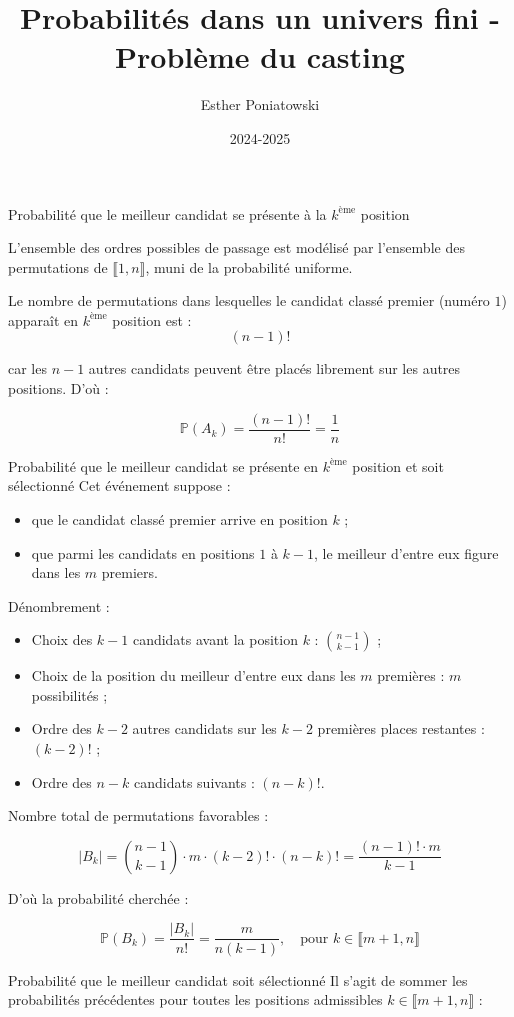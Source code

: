 \documentclass[10pt,a4paper]{article}
\title{Probabilités dans un univers fini - Problème du casting}
\author{Esther Poniatowski}
\date{2024-2025}
\begin{document}
\q Probabilité que le meilleur candidat se présente à la \( k^\text{ème} \) position

L'ensemble des ordres possibles de passage est modélisé par l'ensemble des permutations de \(
\llbracket 1, n \rrbracket \), muni de la probabilité uniforme.

Le nombre de permutations dans lesquelles le candidat classé premier (numéro \( 1 \)) apparaît en \(
k^\text{ème} \) position est :
\[
(n-1)!
\]

car les \( n-1 \) autres candidats peuvent être placés librement sur les autres positions. D'où :

\[
\mathbb{P}(A_k) = \frac{(n-1)!}{n!} = \boxed{\dfrac{1}{n}}
\]


\q Probabilité que le meilleur candidat se présente en \( k^\text{ème} \) position et soit
sélectionné
Cet événement suppose :
\begin{itemize}
 \item que le candidat classé premier arrive en position \( k \) ;
 \item que parmi les candidats en positions \( 1 \) à \( k-1 \), le meilleur d'entre eux figure dans
 les \( m \) premiers.
\end{itemize}

Dénombrement :
\begin{itemize}
 \item Choix des \( k-1 \) candidats avant la position \( k \) : \( \binom{n-1}{k-1} \) ;
 \item Choix de la position du meilleur d'entre eux dans les \( m \) premières : \( m \)
 possibilités ;
 \item Ordre des \( k-2 \) autres candidats sur les \( k-2 \) premières places restantes : \( (k-2)!
 \) ;
 \item Ordre des \( n - k \) candidats suivants : \( (n - k)! \).
\end{itemize}

Nombre total de permutations favorables :

\[
|B_k| = \binom{n-1}{k-1} \cdot m \cdot (k-2)! \cdot (n-k)! = \dfrac{(n-1)! \cdot m}{k - 1}
\]

D'où la probabilité cherchée :

\[
\mathbb{P}(B_k) = \dfrac{|B_k|}{n!} = \boxed{\dfrac{m}{n(k-1)}}, \quad \text{pour } k \in \llbracket m+1, n \rrbracket
\]


\q Probabilité que le meilleur candidat soit sélectionné
Il s'agit de sommer les probabilités précédentes pour toutes les positions admissibles \( k \in
\llbracket m+1, n \rrbracket \) :
\end{document}
